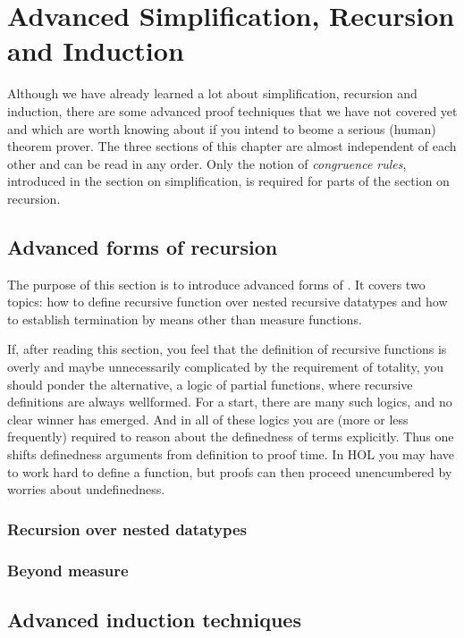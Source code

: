 \chapter{Advanced Simplification, Recursion and Induction}

Although we have already learned a lot about simplification, recursion and
induction, there are some advanced proof techniques that we have not covered
yet and which are worth knowing about if you intend to beome a serious
(human) theorem prover. The three sections of this chapter are almost
independent of each other and can be read in any order. Only the notion of
\emph{congruence rules}, introduced in the section on simplification, is
required for parts of the section on recursion.



\section{Advanced forms of recursion}

The purpose of this section is to introduce advanced forms of . It
covers two topics: how to define recursive function over nested recursive datatypes
and how to establish termination by means other than measure functions.

If, after reading this section, you feel that the definition of recursive
functions is overly and maybe unnecessarily complicated by the requirement of
totality, you should ponder the alternative, a logic of partial functions,
where recursive definitions are always wellformed. For a start, there are many
such logics, and no clear winner has emerged. And in all of these logics you
are (more or less frequently) required to reason about the definedness of
terms explicitly. Thus one shifts definedness arguments from definition to
proof time. In HOL you may have to work hard to define a function, but proofs
can then proceed unencumbered by worries about undefinedness.

\subsection{Recursion over nested datatypes}
\label{sec:nested-recdef}




\subsection{Beyond measure}
\label{sec:wellfounded}


\section{Advanced induction techniques}
\label{sec:advanced-ind}

